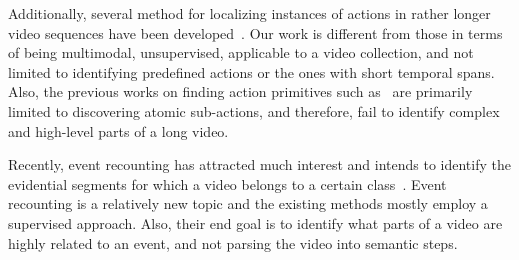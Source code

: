 Additionally, several method for localizing instances of actions in rather longer video sequences have been developed~\cite{duchenne09_iccv, hoai11_cvpr, laptev07_iccv, bojanowski14_eccv, pirsiavash14_cvpr}. Our work is different from those in terms of being multimodal, unsupervised, applicable to a video collection, and not limited to identifying predefined actions or the ones with short temporal spans.
Also, the previous works on finding action primitives such as~\cite{niebles10_eccv, yao10b_cvpr, jain13_cvpr,lan14_eccv, lan14_vs} are primarily limited to discovering atomic sub-actions, and therefore, fail to identify complex and high-level parts of a long video.

Recently, event recounting has attracted much interest and intends to identify the evidential segments for which a video belongs to a certain class~\cite{sun2014discover,das2013thousand,barbu2012video}. Event recounting is a relatively new topic and the existing methods mostly employ a supervised approach. Also, their end goal is to identify what parts of a video are highly related to an event, and not parsing the video into semantic steps.



